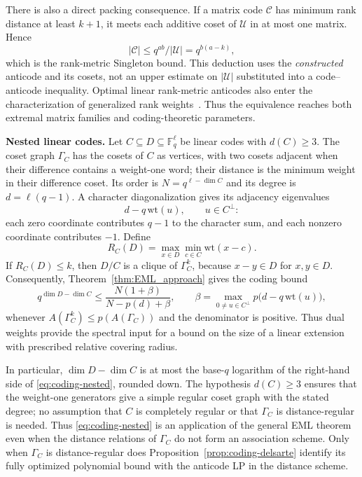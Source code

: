 \documentclass[11pt]{article}
\theoremstyle{plain}
\numberwithin{equation}{section}
\begin{document}
There is also a direct packing consequence. If a matrix code $\mathcal C$ has minimum rank distance at least $k+1$, it meets each additive coset of $\mathcal U$ in at most one matrix. Hence
\[
 |\mathcal C|\le q^{ab}/|\mathcal U|=q^{b(a-k)},
\]
which is the rank-metric Singleton bound. This deduction uses the \emph{constructed} anticode and its cosets, not an upper estimate on $|\mathcal U|$ substituted into a code--anticode inequality. Optimal linear rank-metric anticodes also enter the characterization of generalized rank weights~\cite{Ravagnani_2016}. Thus the equivalence reaches both extremal matrix families and coding-theoretic parameters.
 

\medskip
\textbf{Nested linear codes.}
Let $C\subseteq D\subseteq\mathbb F_q^\ell$ be linear codes with
$d(C)\ge3$. The coset graph $\Gamma_C$ has the cosets of $C$ as vertices,
with two cosets adjacent when their difference contains a weight-one
word; their distance is the minimum weight in their difference coset.
Its order is $N=q^{\ell-\dim C}$ and its degree is $d=\ell(q-1)$.
A character diagonalization gives its adjacency eigenvalues
\[
 d-q\,\mathrm{wt}(u),\qquad u\in C^\perp:
\]
each zero coordinate contributes $q-1$ to the character sum, and each
nonzero coordinate contributes $-1$. Define
\[
 R_C(D)=\max_{x\in D}\min_{c\in C}\mathrm{wt}(x-c).
\]
If $R_C(D)\le k$, then $D/C$ is a clique of $\Gamma_C^k$, because
$x-y\in D$ for $x,y\in D$. Consequently,
Theorem~\ref{thm:EML_approach} gives the coding bound
\begin{equation}\label{eq:coding-nested}
 q^{\dim D-\dim C}\le
 \frac{N(1+\beta)}{N-p(d)+\beta},\qquad
 \beta=\max_{0\ne u\in C^\perp}p\bigl(d-q\,\mathrm{wt}(u)\bigr),
\end{equation}
whenever $A(\Gamma_C^k)\le p(A(\Gamma_C))$ and the denominator is positive.
Thus dual weights provide the spectral input for a bound on the size of
a linear extension with prescribed relative covering radius.

In particular, $\dim D-\dim C$ is at most the base-$q$ logarithm of the right-hand side of \eqref{eq:coding-nested}, rounded down. The hypothesis $d(C)\ge3$ ensures that the weight-one generators give a simple regular coset graph with the stated degree; no assumption that $C$ is completely regular or that $\Gamma_C$ is distance-regular is needed. Thus \eqref{eq:coding-nested} is an application of the general EML theorem even when the distance relations of $\Gamma_C$ do not form an association scheme. Only when $\Gamma_C$ is distance-regular does Proposition~\ref{prop:coding-delsarte} identify its fully optimized polynomial bound with the anticode LP in the distance scheme.
\end{document}
